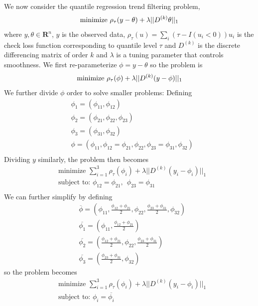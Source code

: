 \documentclass[12pt]{article}
\numberwithin{equation}{section}
\theoremstyle{plain}
\begin{document}
We now consider the quantile regression trend filtering problem,  
\begin{equation}
\text{minimize } \rho_\tau(y-\theta) + \lambda||D^{(k)}\theta||_1\\
\end{equation}
where $y,\theta \in \mathbf{R}^n$, $y$ is the observed data, $\rho_{\tau}(u) = \sum_i(\tau - I(u_i < 0))u_i$ is the check loss function corresponding to quantile level $\tau$ and $D^{(k)}$ is the discrete differencing matrix of order $k$ and $\lambda$ is a tuning parameter that controls smoothness. We first re-parameterize $\phi = y-\theta$ so the problem is
\begin{equation}
\text{minimize } \rho_\tau(\phi) + \lambda||D^{(k)}(y-\phi)||_1\\
\end{equation}
We further divide $\phi$ order to solve smaller problems: Defining
\begin{align}
&\phi_1 = (\phi_{11}, \phi_{12})\\
&\phi_2 = (\phi_{21}, \phi_{22}, \phi_{23})\\
&\phi_3 = (\phi_{31}, \phi_{32})\\
&\phi = (\phi_{11}, \phi_{12}=\phi_{21}, \phi_{22}, \phi_{23}=\phi_{31}, \phi_{32}) \\
\end{align}
Dividing $y$ similarly, the problem then becomes 
\begin{align}
&\text{minimize } \sum_{i=1}^3 \rho_\tau(\phi_i) + \lambda||D^{(k)}(y_i-\phi_i)||_1\\
&\text{subject to: } \phi_{12}=\phi_{21}, ~~ \phi_{23}=\phi_{31}\\
\end{align}
We can further simplify by defining 
\begin{align}
&\overline{\phi} = (\phi_{11}, \frac{\phi_{12}+\phi_{21}}{2}, \phi_{22}, \frac{\phi_{23}+\phi_{31}}{2}, \phi_{32}) \\
&\overline{\phi_1} = (\phi_{11}, \frac{\phi_{12}+\phi_{21}}{2})\\
&\overline{\phi_2} = ( \frac{\phi_{12}+\phi_{21}}{2}, \phi_{22}, \frac{\phi_{23}+\phi_{31}}{2})\\
&\overline{\phi_3} = (\frac{\phi_{23}+\phi_{31}}{2}, \phi_{32})
\end{align}
so the problem becomes
\begin{align}
&\text{minimize } \sum_{i=1}^3 \rho_\tau(\phi_i) + \lambda||D^{(k)}(y_i-\phi_i)||_1\\
&\text{subject to: } \phi_{i}=\overline{\phi_i}\\
\end{align}
\end{document}
